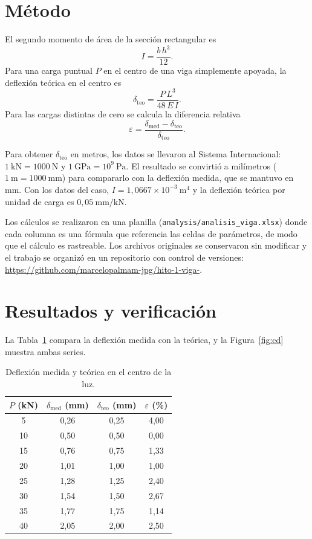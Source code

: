 \documentclass[11pt,a4paper]{article}
\begin{document}
\section{Método}
El segundo momento de área de la sección rectangular es
\begin{equation}
I = \frac{b\,h^{3}}{12}.
\label{eq:I}
\end{equation}
Para una carga puntual $P$ en el centro de una viga simplemente apoyada, la deflexión teórica en el centro es \cite[Ap.~C, p.~814]{hibbeler}
\begin{equation}
\delta_{\mathrm{teo}} = \frac{P\,L^{3}}{48\,E\,I}.
\label{eq:delta}
\end{equation}
Para las cargas distintas de cero se calcula la diferencia relativa
\begin{equation}
\varepsilon = \frac{\delta_{\mathrm{med}}-\delta_{\mathrm{teo}}}{\delta_{\mathrm{teo}}}.
\label{eq:eps}
\end{equation}

Para obtener $\delta_{\mathrm{teo}}$ en metros, los datos se llevaron al Sistema Internacional: $1\ \mathrm{kN}=1000\ \mathrm{N}$ y $1\ \mathrm{GPa}=10^{9}\ \mathrm{Pa}$. El resultado se convirtió a milímetros ($1\ \mathrm{m}=1000\ \mathrm{mm}$) para compararlo con la deflexión medida, que se mantuvo en mm. Con los datos del caso, $I = 1{,}0667\times10^{-3}\ \mathrm{m^{4}}$ y la deflexión teórica por unidad de carga es $0{,}05\ \mathrm{mm/kN}$.

Los cálculos se realizaron en una planilla (\texttt{analysis/analisis\_viga.xlsx}) donde cada columna es una fórmula que referencia las celdas de parámetros, de modo que el cálculo es rastreable. Los archivos originales se conservaron sin modificar y el trabajo se organizó en un repositorio con control de versiones: \url{https://github.com/marcelopalmam-jpg/hito-1-viga-}.

\section{Resultados y verificación}
La Tabla~\ref{tab:res} compara la deflexión medida con la teórica, y la Figura~\ref{fig:cd} muestra ambas series.

\begin{table}[h]
\centering
\caption{Deflexión medida y teórica en el centro de la luz.}
\label{tab:res}
\begin{tabular}{cccc}
\toprule
$P$ (kN) & $\delta_{\mathrm{med}}$ (mm) & $\delta_{\mathrm{teo}}$ (mm) & $\varepsilon$ (\%) \\
\midrule
5  & 0,26 & 0,25 & 4,00 \\
10 & 0,50 & 0,50 & 0,00 \\
15 & 0,76 & 0,75 & 1,33 \\
20 & 1,01 & 1,00 & 1,00 \\
25 & 1,28 & 1,25 & 2,40 \\
30 & 1,54 & 1,50 & 2,67 \\
35 & 1,77 & 1,75 & 1,14 \\
40 & 2,05 & 2,00 & 2,50 \\
\bottomrule
\end{tabular}
\end{table}
\end{document}
